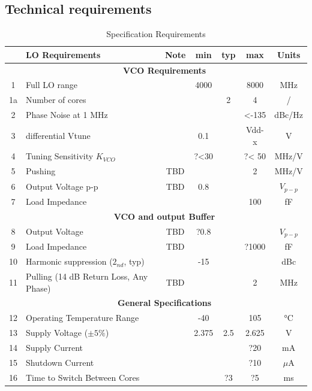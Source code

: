 \newpage

\subsection{Technical requirements}

\begin{table}[ht]
	\centering
	\begin{tabular}{|c|l|c|c|c|c|c|}
		\hline
		& LO Requirements & Note & min & typ & max & Units \\
		\hline
		& \multicolumn{6}{|c|}{\textbf{VCO Requirements}} \\
		\hline
		1 & Full LO range &  & 4000  &  & 8000 & MHz \\ 
		\hline
		1a & Number of cores &  &   & 2 & 4 & / \\ 
		\hline
		2 & Phase Noise at 1 MHz &  &  &  & <-135 & dBc/Hz \\ 
		\hline
		3 & differential Vtune &  & 0.1 &  & Vdd-x & V  \\ %
		\hline
		4 & Tuning Sensitivity $K_{VCO}$ &  & ?<30 &  & ?< 50 & MHz/V  \\ 
		\hline
		5 & Pushing & TBD &  &  & 2 & MHz/V  \\ 
		\hline
		6 & Output Voltage p-p & TBD & 0.8 &  & & $V_{p-p}$  \\ 
		\hline
		7 & Load Impedance &  &  &  & 100 & fF  \\ 
		\hline
		& \multicolumn{6}{|c|}{\textbf{VCO and output Buffer}} \\
		\hline
		8 & Output Voltage & TBD & ?0.8  &  &  & $V_{p-p}$ \\ 
		\hline
		9 & Load Impedance & TBD &  &  & ?1000 & fF  \\ 
		\hline
		10 & Harmonic suppression ($2_{nd}$, typ) &  & -15 &  &  & dBc  \\ 
		\hline
		11 & Pulling (14 dB Return Loss, Any Phase) & TBD &  &  & 2 & MHz  \\ 
		\hline
		& \multicolumn{6}{|c|}{\textbf{General Specifications}} \\
		\hline
		12 & Operating Temperature Range &  & -40 &  & 105 & °C  \\ 
		\hline
		13 & Supply Voltage ($\pm 5\%$) &  & 2.375 & 2.5 & 2.625 & V  \\ 
		\hline
		14 & Supply Current &  &  &  & ?20 & mA  \\ 
		\hline
		15 & Shutdown Current &  &  &  & ?10 & $\mu$A  \\ 
		\hline
		16 & Time to Switch Between Cores  &  &  & ?3 & ?5 & ms  \\ 
		\hline
	\end{tabular}
	\label{table-spec-ultra-low-noise}
	\caption{Specification Requirements} 

\end{table}

